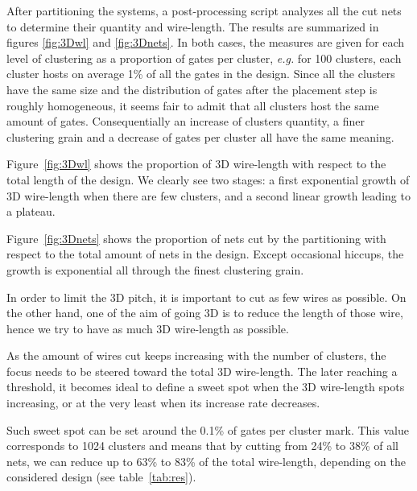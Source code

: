 \documentclass[conference]{IEEEtran}
\begin{document}
After partitioning the systems, a post-processing script analyzes all the cut nets to determine their quantity and wire-length.
The results are summarized in figures \ref{fig:3Dwl} and \ref{fig:3Dnets}.
In both cases, the measures are given for each level of clustering as a proportion of gates per cluster, \textit{e.g.} for 100 clusters, each cluster hosts on average 1\% of all the gates in the design.
Since all the clusters have the same size and the distribution of gates after the placement step is roughly homogeneous, it seems fair to admit that all clusters host the same amount of gates.
Consequentially an increase of clusters quantity, a finer clustering grain and a decrease of gates per cluster all have the same meaning.

Figure~\ref{fig:3Dwl} shows the proportion of 3D wire-length with respect to the total length of the design.
We clearly see two stages: a first exponential growth of 3D wire-length when there are few clusters, and a second linear growth leading to a plateau.

Figure~\ref{fig:3Dnets} shows the proportion of nets cut by the partitioning with respect to the total amount of nets in the design.
Except occasional hiccups, the growth is exponential all through the finest clustering grain.

In order to limit the 3D pitch, it is important to cut as few wires as possible.
On the other hand, one of the aim of going 3D is to reduce the length of those wire, hence we try to have as much 3D wire-length as possible.

As the amount of wires cut keeps increasing with the number of clusters, the focus needs to be steered toward the total 3D wire-length.
The later reaching a threshold, it becomes ideal to define a sweet spot when the 3D wire-length spots increasing, or at the very least when its increase rate decreases.

Such sweet spot can be set around the 0.1\% of gates per cluster mark.
This value corresponds to 1024 clusters and means that by cutting from 24\% to 38\% of all nets, we can reduce up to 63\% to 83\% of the total wire-length, depending on the considered design (see table~\ref{tab:res}).
\end{document}
